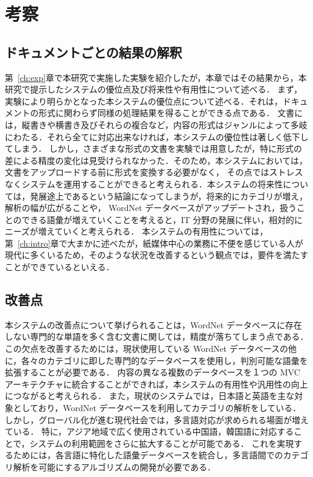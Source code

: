 \chapter{考察}
\label{ch:eval}

\quad

\section{ドキュメントごとの結果の解釈}
\label{sec:eval_docs}

第~\ref{ch:exp}章で本研究で実施した実験を紹介したが，本章ではその結果から，本研究で提示したシステムの優位点及び将来性や有用性について述べる．
まず，実験により明らかとなった本システムの優位点について述べる．それは，ドキュメントの形式に関わらず同様の処理結果を得ることができる点である．
文書には，縦書きや横書き及びそれらの複合など，内容の形式はジャンルによって多岐にわたる．それら全てに対応出来なければ，本システムの優位性は著しく低下してしまう．
しかし，さまざまな形式の文書を実験では用意したが，特に形式の差による精度の変化は見受けられなかった．そのため，本システムにおいては，文書をアップロードする前に形式を変換する必要がなく，
その点ではストレスなくシステムを運用することができると考えられる．本システムの将来性については，発展途上であるという結論になってしまうが，将来的にカテゴリが増え，解析の幅が広がることや，
WordNet データベースがアップデートされ，扱うことのできる語彙が増えていくことを考えると，IT 分野の発展に伴い，相対的にニーズが増えていくと考えられる．
本システムの有用性については，第~\ref{ch:intro}章で大まかに述べたが，紙媒体中心の業務に不便を感じている人が現代に多くいるため，そのような状況を改善するという観点では，要件を満たすことができているといえる．

\section{改善点}
\label{sec:eval_improve}
本システムの改善点について挙げられることは，WordNet データベースに存在しない専門的な単語を多く含む文書に関しては，精度が落ちてしまう点である．
この欠点を改善するためには，現状使用している WordNet データべースの他に，各々のカテゴリに即した専門的なデータベースを使用し，判別可能な語彙を拡張することが必要である．
内容の異なる複数のデータベースを１つの MVC アーキテクチャに統合することができれば，本システムの有用性や汎用性の向上につながると考えられる．
また，現状のシステムでは，日本語と英語を主な対象としており，WordNet データベースを利用してカテゴリの解析をしている．しかし，グローバル化が進む現代社会では，多言語対応が求められる場面が増えている．
特に，アジア地域で広く使用されている中国語，韓国語に対応することで，システムの利用範囲をさらに拡大することが可能である．
これを実現するためには，各言語に特化した語彙データベースを統合し，多言語間でのカテゴリ解析を可能にするアルゴリズムの開発が必要である．

